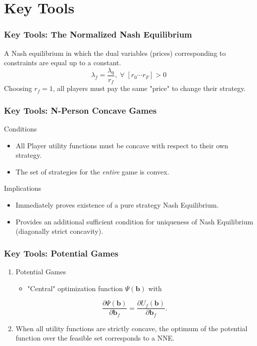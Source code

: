\documentclass[10pt,tgadventor, onlymath]{beamer}
\begin{document}
\section{Key Tools}

\begin{frame}
\frametitle{Key Tools: The Normalized Nash Equilibrium}
A Nash equilibrium in which the dual variables (prices) corresponding to constraints are equal up to a constant.
\begin{equation}
\lambda_f = \frac{\lambda_{0}}{ r_f}, \; \forall \; [r_0 \cdots r_F] > 0 
\end{equation}
Choosing $r_f =1$, all players must pay the same "price" to change their strategy. 
\end{frame}


\begin{frame}
\frametitle{Key Tools: N-Person Concave Games}
Conditions
\begin{itemize}
\item All Player utility functions must be concave with respect to their own strategy.
\item The set of strategies for the \emph{entire} game is convex. 
\end{itemize}
\bigskip
Implications
\begin{itemize}
\item Immediately proves existence of a pure strategy Nash Equilibrium.
\item Provides an additional sufficient condition for uniqueness of Nash Equilibrium (diagonally strict concavity).
\end{itemize}
\end{frame}


\begin{frame}
\frametitle{Key Tools: Potential Games}
\begin{enumerate}
\item 
Potential Games
\begin{itemize}
\item "Central" optimization function $\Psi(\mathbf{b})$ with
\end{itemize}
\begin{equation}\label{potential_game_condition}
\frac{\partial \Psi(\mathbf{b})}{\partial \mathbf{b}_{f}}
 =
 \frac{\partial U_f(\mathbf{b})}{\partial \mathbf{b}_{f}}.
\end{equation} 
\item 
When all utility functions are strictly concave, the optimum of the potential function over the feasible set corresponds to a NNE.
\end{enumerate}
\end{frame}
\end{document}
